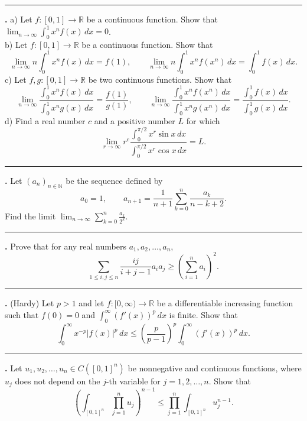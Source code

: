\documentclass[11pt]{article}
\newcounter{probnum}
\newenvironment{problembox}{\par\noindent\rule{\linewidth}{0.5pt}\vspace{5pt}\par}{\vspace{2pt}}
\begin{document}
\begin{problembox}
\textbf{\theprobnum.} a) Let $f : [0,1] \to \mathbb{R}$ be a continuous function. Show that $\displaystyle\lim_{n \to \infty} \int_0^1 x^n f(x)\,dx = 0$.\\
b) Let $f : [0,1] \to \mathbb{R}$ be a continuous function. Show that
\[
\lim_{n \to \infty} n \int_0^1 x^n f(x)\,dx = f(1), \qquad \lim_{n \to \infty} n \int_0^1 x^n f(x^n)\,dx = \int_0^1 f(x)\,dx.
\]
c) Let $f, g : [0,1] \to \mathbb{R}$ be two continuous functions. Show that
\[
\lim_{n \to \infty} \frac{\int_0^1 x^n f(x)\,dx}{\int_0^1 x^n g(x)\,dx} = \frac{f(1)}{g(1)}, \qquad \lim_{n \to \infty} \frac{\int_0^1 x^n f(x^n)\,dx}{\int_0^1 x^n g(x^n)\,dx} = \frac{\int_0^1 f(x)\,dx}{\int_0^1 g(x)\,dx}.
\]
d) Find a real number $c$ and a positive number $L$ for which
\[
\lim_{r \to \infty} r^c \frac{\int_0^{\pi/2} x^r \sin x\,dx}{\int_0^{\pi/2} x^r \cos x\,dx} = L.
\]
\end{problembox}

\begin{problembox}
\textbf{\theprobnum.} Let $(a_n)_{n \in \mathbb{N}}$ be the sequence defined by
\[
a_0 = 1, \qquad a_{n+1} = \frac{1}{n+1} \sum_{k=0}^{n} \frac{a_k}{n-k+2}.
\]
Find the limit $\displaystyle\lim_{n \to \infty} \sum_{k=0}^{n} \frac{a_k}{2^k}$.
\end{problembox}

\begin{problembox}
\textbf{\theprobnum.} Prove that for any real numbers $a_1, a_2, \ldots, a_n$,
\[
\sum_{1 \le i,j \le n} \frac{ij}{i+j-1} a_i a_j \ge \left(\sum_{i=1}^{n} a_i\right)^2.
\]
\end{problembox}

\begin{problembox}
\textbf{\theprobnum.} (Hardy) Let $p > 1$ and let $f : [0,\infty) \to \mathbb{R}$ be a differentiable increasing function such that $f(0) = 0$ and $\displaystyle\int_0^{\infty} (f'(x))^p\,dx$ is finite. Show that
\[
\int_0^{\infty} x^{-p} |f(x)|^p\,dx \le \left(\frac{p}{p-1}\right)^p \int_0^{\infty} (f'(x))^p\,dx.
\]
\end{problembox}

\begin{problembox}
\textbf{\theprobnum.} Let $u_1, u_2, \ldots, u_n \in C([0,1]^n)$ be nonnegative and continuous functions, where $u_j$ does not depend on the $j$-th variable for $j = 1, 2, \ldots, n$. Show that
\[
\left(\int_{[0,1]^n} \prod_{j=1}^{n} u_j\right)^{n-1} \le \prod_{j=1}^{n} \int_{[0,1]^n} u_j^{n-1}.
\]
\end{problembox}
\end{document}
